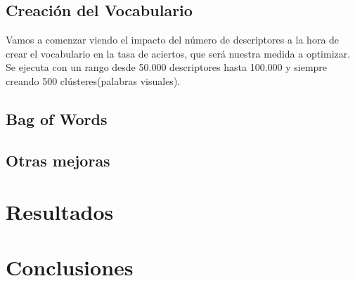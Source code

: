 \documentclass[a4paper,12pt]{article}
\begin{document}
\subsection{Creación del Vocabulario}
Vamos a comenzar viendo el impacto del número de descriptores a la hora de
crear el vocabulario en la tasa de aciertos, que será nuestra medida a 
optimizar. Se ejecuta con un rango desde 50.000 descriptores hasta 100.000 y 
siempre creando 500 clústeres(palabras visuales). 







\subsection{Bag of Words}




\subsection{Otras mejoras}



\newpage
\section{Resultados}




\newpage
\section{Conclusiones}

\end{document}

